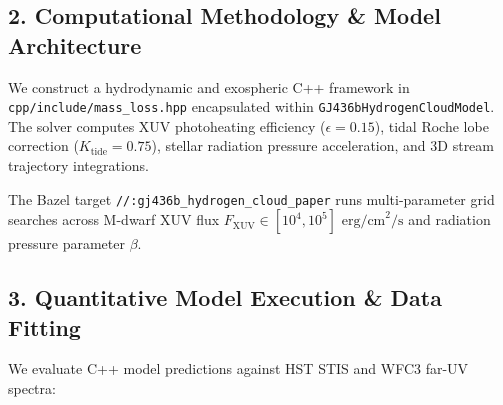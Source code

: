 \documentclass[11pt,a4paper]{article}
\begin{document}
\subsection*{2. Computational Methodology \& Model Architecture}
We construct a hydrodynamic and exospheric C++ framework in \texttt{cpp/include/mass\_loss.hpp} encapsulated within \texttt{GJ436bHydrogenCloudModel}. The solver computes XUV photoheating efficiency ($\epsilon = 0.15$), tidal Roche lobe correction ($K_{\text{tide}} = 0.75$), stellar radiation pressure acceleration, and 3D stream trajectory integrations.

The Bazel target \texttt{//:gj436b\_hydrogen\_cloud\_paper} runs multi-parameter grid searches across M-dwarf XUV flux $F_{\text{XUV}} \in [10^4, 10^5]\text{ erg/cm}^2/\text{s}$ and radiation pressure parameter $\beta$.

\subsection*{3. Quantitative Model Execution \& Data Fitting}
We evaluate C++ model predictions against HST STIS and WFC3 far-UV spectra:

\begin{table}[H]
\centering
\caption{\textbf{Quantitative Comparison: HST STIS/WFC3 Data vs. C++ Model}}
\end{table}
\end{document}

